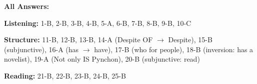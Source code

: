 \documentclass[10pt,a4paper]{article}
\begin{document}
\textbf{All Answers:}

\textbf{Listening:} 1-B, 2-B, 3-B, 4-B, 5-A, 6-B, 7-B, 8-B, 9-B, 10-C

\textbf{Structure:} 11-B, 12-B, 13-B, 14-A (Despite OF $\to$ Despite),
15-B (subjunctive), 16-A (has $\to$ have), 17-B (who for people),
18-B (inversion: has a novelist), 19-A (Not only IS Pynchon),
20-B (subjunctive: read)

\textbf{Reading:} 21-B, 22-B, 23-B, 24-B, 25-B
\end{document}
